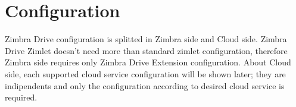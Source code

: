 \chapter{Configuration}\label{cha:configuration}

Zimbra Drive configuration is splitted in Zimbra side and Cloud side.
Zimbra Drive Zimlet doesn't need more than standard zimlet configuration,
therefore Zimbra side requires only Zimbra Drive Extension configuration.
About Cloud side, each supported cloud service configuration will be shown later;
they are indipendents and only the configuration according to desired cloud service is required.



